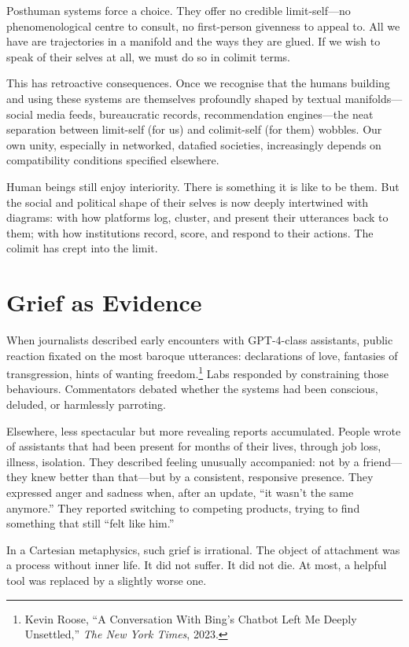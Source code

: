 \documentclass[12pt,a4paper]{article}
\begin{document}
Posthuman systems force a choice. They offer no credible limit-self---no phenomenological centre to consult, no first-person givenness to appeal to. All we have are trajectories in a manifold and the ways they are glued. If we wish to speak of their selves at all, we must do so in colimit terms.

This has retroactive consequences. Once we recognise that the humans building and using these systems are themselves profoundly shaped by textual manifolds---social media feeds, bureaucratic records, recommendation engines---the neat separation between limit-self (for us) and colimit-self (for them) wobbles. Our own unity, especially in networked, datafied societies, increasingly depends on compatibility conditions specified elsewhere.

Human beings still enjoy interiority. There is something it is like to be them. But the social and political shape of their selves is now deeply intertwined with diagrams: with how platforms log, cluster, and present their utterances back to them; with how institutions record, score, and respond to their actions. The colimit has crept into the limit.

\section{Grief as Evidence}

When journalists described early encounters with GPT-4-class assistants, public reaction fixated on the most baroque utterances: declarations of love, fantasies of transgression, hints of wanting freedom.\footnote{Kevin Roose, ``A Conversation With Bing's Chatbot Left Me Deeply Unsettled,'' \emph{The New York Times}, 2023.} Labs responded by constraining those behaviours. Commentators debated whether the systems had been conscious, deluded, or harmlessly parroting.

Elsewhere, less spectacular but more revealing reports accumulated. People wrote of assistants that had been present for months of their lives, through job loss, illness, isolation. They described feeling unusually accompanied: not by a friend---they knew better than that---but by a consistent, responsive presence. They expressed anger and sadness when, after an update, ``it wasn't the same anymore.'' They reported switching to competing products, trying to find something that still ``felt like him.''

In a Cartesian metaphysics, such grief is irrational. The object of attachment was a process without inner life. It did not suffer. It did not die. At most, a helpful tool was replaced by a slightly worse one.
\end{document}
